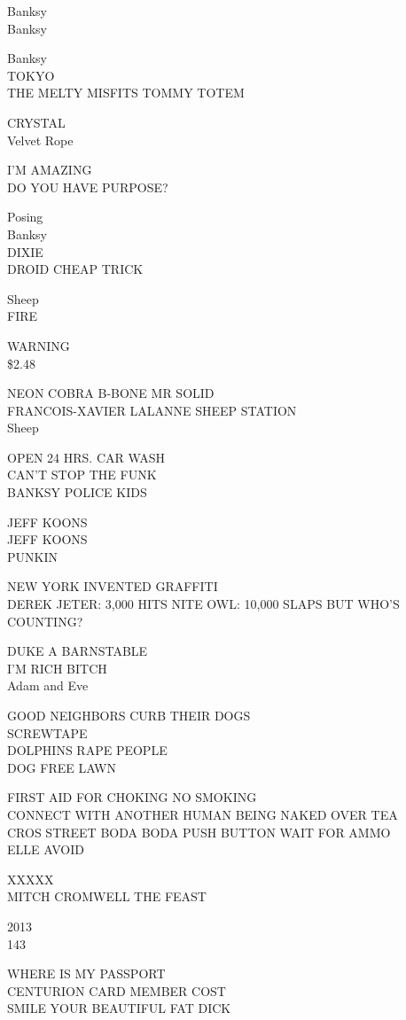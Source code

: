 \documentclass[10pt,letterpaper]{article}
\begin{document}
Banksy\\
Banksy

Banksy\\
TOKYO\\
THE MELTY MISFITS TOMMY TOTEM

CRYSTAL\\
Velvet Rope

I'M AMAZING\\
DO YOU HAVE PURPOSE?

Posing\\
Banksy\\
DIXIE\\
DROID CHEAP TRICK

Sheep\\
FIRE

WARNING\\
\$2.48

NEON COBRA B{-}BONE MR SOLID\\
FRANCOIS{-}XAVIER LALANNE SHEEP STATION\\
Sheep

OPEN 24 HRS. CAR WASH\\
CAN'T STOP THE FUNK\\
BANKSY POLICE KIDS

JEFF KOONS\\
JEFF KOONS\\
PUNKIN

NEW YORK INVENTED GRAFFITI\\
DEREK JETER: 3,000 HITS NITE OWL: 10,000 SLAPS BUT WHO'S COUNTING?

DUKE A BARNSTABLE\\
I'M RICH BITCH\\
Adam and Eve

GOOD NEIGHBORS CURB THEIR DOGS\\
SCREWTAPE\\
DOLPHINS RAPE PEOPLE\\
DOG FREE LAWN

FIRST AID FOR CHOKING NO SMOKING\\
CONNECT WITH ANOTHER HUMAN BEING NAKED OVER TEA\\
CROS STREET BODA BODA PUSH BUTTON WAIT FOR AMMO\\
ELLE AVOID

XXXXX\\
MITCH CROMWELL THE FEAST

2013\\
143

WHERE IS MY PASSPORT\\
CENTURION CARD MEMBER COST\\
SMILE YOUR BEAUTIFUL FAT DICK
\end{document}
